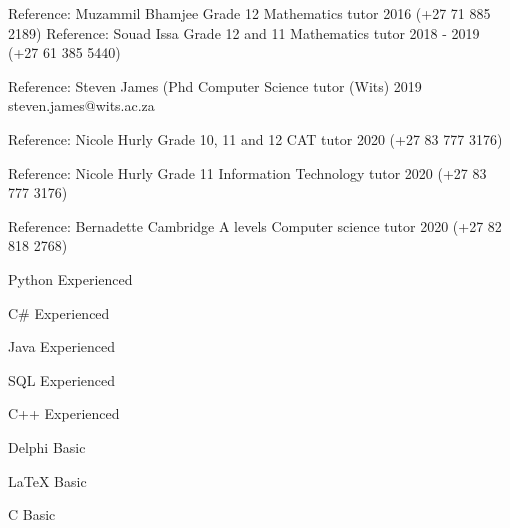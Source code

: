 \documentclass[]{awesome-cv}
\begin{document}
\begin{cventries}
	\cventry
	{Reference: Muzammil Bhamjee}
	{Grade 12 Mathematics tutor}
	{2016}
	{}
	{(+27 71 885 2189)}
\vspace{-1mm}
	\cventry
	{Reference: Souad Issa}
	{Grade 12 and 11 Mathematics tutor}
	{2018 - 2019}
	{}
	{(+27 61 385 5440)}
	\vspace{-1mm}

	\cventry
	{Reference: Steven James (Phd}
	{Computer Science tutor (Wits) }
	{2019}
	{}
	{steven.james@wits.ac.za}
	\vspace{-1mm}

	\cventry
	{Reference: Nicole Hurly}
	{Grade 10, 11 and 12 CAT tutor}
	{2020}
	{}
	{(+27 83 777 3176)}
	\vspace{-1mm}

	\cventry
	{Reference: Nicole Hurly}
	{Grade 11 Information Technology tutor}
	{2020}
	{}
	{(+27 83 777 3176)}
	\vspace{-1mm}

	\cventry
	{Reference: Bernadette}
	{Cambridge A levels Computer science tutor}
	{2020}
	{}
	{(+27 82 818 2768)}
\end{cventries}
\begin{cventries}
\vspace{-4mm}
	\cventry
	{}
	{Python\vspace{-5mm}}
	{Experienced\vspace{-5mm}}
	{}
	{}
	
	\vspace{-11mm}
	\cventry
	{}
	{C\# \vspace{-5mm}}
	{Experienced\vspace{-5mm}}
	{}
	{}
	
	\vspace{-11mm}
	\cventry
	{}
	{Java\vspace{-5mm}}
	{Experienced\vspace{-5mm}}
	{}
	{}
	
	\vspace{-11mm}
	\cventry
	{}
	{SQL\vspace{-5mm}}
	{Experienced\vspace{-5mm}}
	{}
	{}
	\vspace{-11mm}
	
	\cventry
	{}
	{C++\vspace{-5mm}}
	{Experienced\vspace{-5mm}}
	{}
	{}
		\vspace{-11mm}

	\cventry
	{}
	{Delphi\vspace{-5mm}}
	{Basic\vspace{-5mm}}
	{}
	{}
		\vspace{-11mm}

	\cventry
	{}
	{LaTeX\vspace{-5mm}}
	{Basic\vspace{-5mm}}
	{}
	{}
		\vspace{-11mm}
 
	\cventry
	{}
	{C \vspace{-5mm}}
	{Basic\vspace{-5mm}}
	{}
	{}
\end{cventries}

\ 
\end{document}
